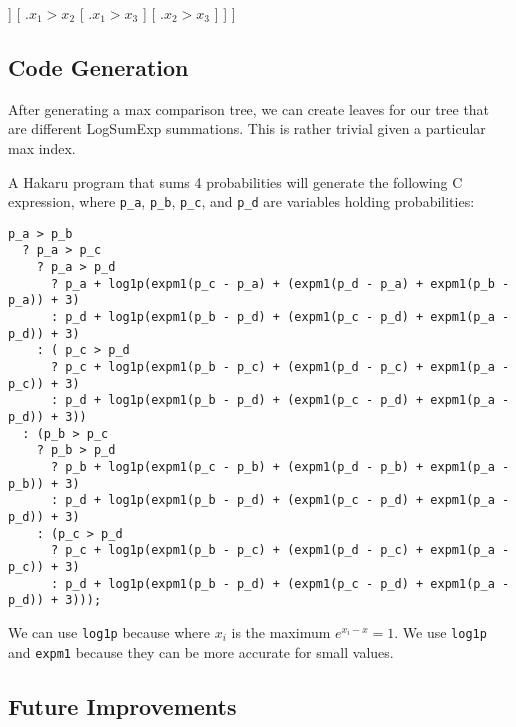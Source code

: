 \documentclass{article}
\begin{document}
\begin{center}
\Tree [ .{$x_0 > x_1$}
        [ .{$x_0 > x_2$}
          [ .{$x_0 > x_3$}
          ]
          [ .{$x_2 > x_3$}
          ]
        ]
        [ .{$x_1 > x_2$}
          [ .{$x_1 > x_3$}
          ]
          [ .{$x_2 > x_3$}
          ]
        ]
      ]
\end{center}

\subsection*{Code Generation}

After generating a max comparison tree, we can create leaves for our tree that
are different LogSumExp summations. This is rather trivial given a particular
max index.


A Hakaru program that sums 4 probabilities will generate the following C
expression, where {\tt p\_a}, {\tt p\_b}, {\tt p\_c}, and {\tt p\_d} are
variables holding probabilities:

\begin{center}
\begin{verbatim}
p_a > p_b
  ? p_a > p_c
    ? p_a > p_d
      ? p_a + log1p(expm1(p_c - p_a) + (expm1(p_d - p_a) + expm1(p_b - p_a)) + 3)
      : p_d + log1p(expm1(p_b - p_d) + (expm1(p_c - p_d) + expm1(p_a - p_d)) + 3)
    : ( p_c > p_d
      ? p_c + log1p(expm1(p_b - p_c) + (expm1(p_d - p_c) + expm1(p_a - p_c)) + 3)
      : p_d + log1p(expm1(p_b - p_d) + (expm1(p_c - p_d) + expm1(p_a - p_d)) + 3))
  : (p_b > p_c
    ? p_b > p_d
      ? p_b + log1p(expm1(p_c - p_b) + (expm1(p_d - p_b) + expm1(p_a - p_b)) + 3)
      : p_d + log1p(expm1(p_b - p_d) + (expm1(p_c - p_d) + expm1(p_a - p_d)) + 3)
    : (p_c > p_d
      ? p_c + log1p(expm1(p_b - p_c) + (expm1(p_d - p_c) + expm1(p_a - p_c)) + 3)
      : p_d + log1p(expm1(p_b - p_d) + (expm1(p_c - p_d) + expm1(p_a - p_d)) + 3)));
\end{verbatim}
\end{center}

We can use {\tt log1p} because where $x_i$ is the maximum
$e^{x_i - \hat x} = 1$. We use {\tt log1p} and {\tt expm1} because they can be
more accurate for small values.


\subsection*{Future Improvements}
\end{document}
